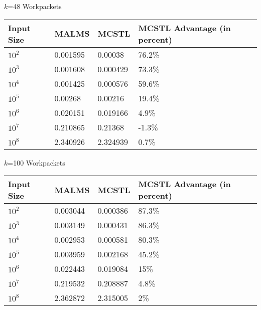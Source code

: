 \documentclass{article}
\begin{document}
$k$=48 Workpackets


\begin{tabular}{l|l|l|l}
Input Size	& MALMS		& MCSTL		& MCSTL Advantage (in percent)	\\
\hline
$10^2$		& 0.001595	& 0.00038	& 76.2\% \\
$10^3$		& 0.001608	& 0.000429	& 73.3\% \\
$10^4$		& 0.001425	& 0.000576	& 59.6\% \\
$10^5$		& 0.00268	& 0.00216	& 19.4\% \\
$10^6$		& 0.020151	& 0.019166	& 4.9\% \\
$10^7$		& 0.210865	& 0.21368	& -1.3\% \\
$10^8$		& 2.340926	& 2.324939	& 0.7\% \\
\end{tabular}



$k$=100 Workpackets

\begin{tabular}{l|l|l|l}
Input Size	& MALMS		& MCSTL		& MCSTL Advantage (in percent)	\\
\hline
$10^2$		& 0.003044	& 0.000386	& 87.3\% \\
$10^3$		& 0.003149	& 0.000431	& 86.3\% \\
$10^4$		& 0.002953	& 0.000581	& 80.3\% \\
$10^5$		& 0.003959	& 0.002168	& 45.2\% \\
$10^6$		& 0.022443	& 0.019084	& 15\% \\
$10^7$		& 0.219532	& 0.208887	& 4.8\% \\
$10^8$		& 2.362872	& 2.315005	& 2\% \\
\end{tabular}
\end{document}
